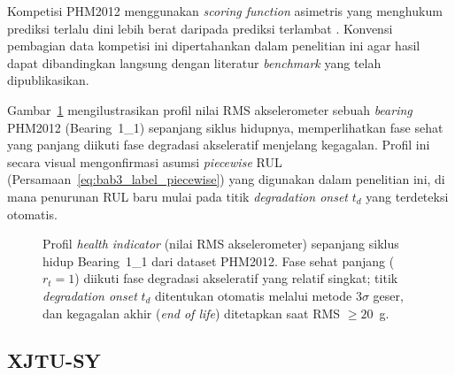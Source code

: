 Kompetisi PHM2012 menggunakan \emph{scoring function} asimetris yang
menghukum prediksi terlalu dini lebih berat daripada prediksi terlambat
.
Konvensi pembagian data kompetisi ini dipertahankan dalam penelitian ini
agar hasil dapat dibandingkan langsung dengan literatur \emph{benchmark}
yang telah dipublikasikan.

Gambar~\ref{fig:bab4_dataset_lifecycle} mengilustrasikan profil nilai RMS
akselerometer sebuah \emph{bearing} PHM2012 (Bearing~1\_1) sepanjang siklus
hidupnya, memperlihatkan fase sehat yang panjang diikuti fase degradasi
akseleratif menjelang kegagalan. Profil ini secara visual mengonfirmasi
asumsi \emph{piecewise} RUL (Persamaan~\ref{eq:bab3_label_piecewise}) yang
digunakan dalam penelitian ini, di mana penurunan RUL baru mulai pada titik
\emph{degradation onset} $t_d$ yang terdeteksi otomatis.

\begin{figure}[ht]
  \centering
  \caption{Profil \emph{health indicator} (nilai RMS akselerometer) sepanjang
           siklus hidup Bearing~1\_1 dari dataset PHM2012. Fase sehat panjang
           ($r_t = 1$) diikuti fase degradasi akseleratif yang relatif singkat;
           titik \emph{degradation onset} $t_d$ ditentukan otomatis melalui
           metode $3\sigma$ geser, dan kegagalan akhir (\emph{end of life})
           ditetapkan saat RMS $\geq 20$~g.}
  \label{fig:bab4_dataset_lifecycle}
\end{figure}

\subsection{XJTU-SY}
\label{subsec:bab4_xjtusy}

